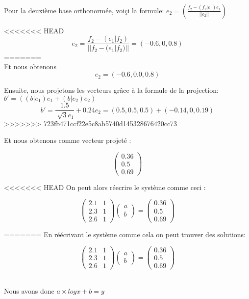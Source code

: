 \\ 
Pour la deuxième base orthonormée, voiçi la formule:  $e_2=(\frac{f_2-(f_2|e_1)e_1}{||e_2||})$

<<<<<<< HEAD
$$e_2 = \frac{f_2 - (e_1|f_2)}{||f_2 - (e_1|f_2)||} = (-0.6, 0, 0.8)$$
=======
\\Et nous obtenons
\[e_2=( -0.6, 0.0, 0.8)\]

\bigbreak
Ensuite, nous projetons les vecteurs grâce à la formule de la projection: $b'=((b|e_1)e_1+(b|e_2)e_2)$
\[b'=\frac{1.5}{\sqrt[]{3}e_1}+0.24e_2=(0.5,0.5,0.5)+(-0.14,0,0.19)\]
>>>>>>> 723fb471ccf22e5c8ab5740d145328676420cc73

Et nous obtenons comme vecteur projeté :

$$
\begin{pmatrix}  
	0.36\\
	0.5\\
	0.69
\end{pmatrix}
$$

<<<<<<< HEAD
On peut alors réecrire le système comme ceci :

$$
 \begin{pmatrix}  
  2.1 & 1\\
  2.3 & 1 \\
  2.6 & 1 
 \end{pmatrix}
 \begin{pmatrix}  
 a\\
 b
 \end{pmatrix}
 =
 \begin{pmatrix}  
 0.36\\
 0.5\\
 0.69
 \end{pmatrix}
$$

=======
\bigbreak
En réécrivant le système comme cela on peut trouver des solutions:

$$
\begin{pmatrix}  
 2.1 & 1\\
 2.3 & 1 \\
 2.6 & 1 
\end{pmatrix}
\begin{pmatrix}  
a\\
b
\end{pmatrix}
=
\begin{pmatrix}  
0.36\\
0.5\\
0.69
\end{pmatrix}
$$

\bigbreak

\\
Nous avons donc $a\times log{x} + b=y$ \Rightarrow 

